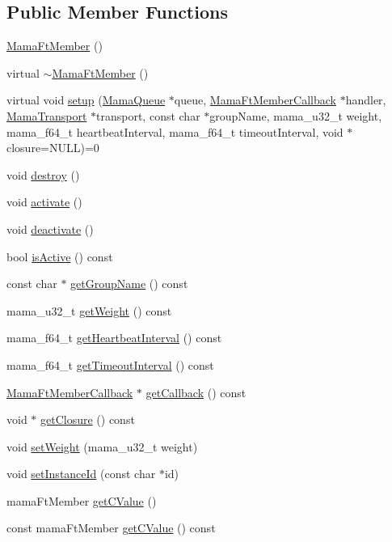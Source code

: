 \subsection*{Public Member Functions}
\begin{DoxyCompactItemize}
\item 
\hyperlink{classWombat_1_1MamaFtMember_a78a5ee531a706e6c48c58a891588e0c7}{MamaFtMember} ()
\item 
virtual \hyperlink{classWombat_1_1MamaFtMember_a553c0f20f0e0badba3cbfbc3b7560275}{$\sim$MamaFtMember} ()
\item 
virtual void \hyperlink{classWombat_1_1MamaFtMember_a5a57ce6bb1f5d7ff85eac37acbf4b405}{setup} (\hyperlink{classWombat_1_1MamaQueue}{MamaQueue} $\ast$queue, \hyperlink{classWombat_1_1MamaFtMemberCallback}{MamaFtMemberCallback} $\ast$handler, \hyperlink{classWombat_1_1MamaTransport}{MamaTransport} $\ast$transport, const char $\ast$groupName, mama\_\-u32\_\-t weight, mama\_\-f64\_\-t heartbeatInterval, mama\_\-f64\_\-t timeoutInterval, void $\ast$closure=NULL)=0
\item 
void \hyperlink{classWombat_1_1MamaFtMember_acd39754cf01f3dc2bfd58de81066529e}{destroy} ()
\item 
void \hyperlink{classWombat_1_1MamaFtMember_a91dbc23931995917b65c65b265d514ac}{activate} ()
\item 
void \hyperlink{classWombat_1_1MamaFtMember_aa24e0b13650e11700c4b5650f8beb190}{deactivate} ()
\item 
bool \hyperlink{classWombat_1_1MamaFtMember_a01bdb68194841219fd08066b61052d59}{isActive} () const 
\item 
const char $\ast$ \hyperlink{classWombat_1_1MamaFtMember_a2f82bbb437a4064fa2ba261453fc6d61}{getGroupName} () const 
\item 
mama\_\-u32\_\-t \hyperlink{classWombat_1_1MamaFtMember_a1b80e55dd3137e78f1e4eeabd647163e}{getWeight} () const 
\item 
mama\_\-f64\_\-t \hyperlink{classWombat_1_1MamaFtMember_a69457de68353a2f666d657fc0d1de19f}{getHeartbeatInterval} () const 
\item 
mama\_\-f64\_\-t \hyperlink{classWombat_1_1MamaFtMember_a1d4d5d3402fdca072abf8a586c6f2b5b}{getTimeoutInterval} () const 
\item 
\hyperlink{classWombat_1_1MamaFtMemberCallback}{MamaFtMemberCallback} $\ast$ \hyperlink{classWombat_1_1MamaFtMember_a663ef7867faff8323d0f22cdf8f9bc98}{getCallback} () const 
\item 
void $\ast$ \hyperlink{classWombat_1_1MamaFtMember_ae85d406375efd4325671c4109df3f56d}{getClosure} () const 
\item 
void \hyperlink{classWombat_1_1MamaFtMember_afd89c66a28f99b6f716e70fe12e7473f}{setWeight} (mama\_\-u32\_\-t weight)
\item 
void \hyperlink{classWombat_1_1MamaFtMember_aecc24a6fc92f4fe699e6003c0297ddb3}{setInstanceId} (const char $\ast$id)
\item 
mamaFtMember \hyperlink{classWombat_1_1MamaFtMember_a9f9d307fc61f5283850527f313763d18}{getCValue} ()
\item 
const mamaFtMember \hyperlink{classWombat_1_1MamaFtMember_a5ba8e9c0b12adfe858d8c7ddeef4dbed}{getCValue} () const 
\end{DoxyCompactItemize}
